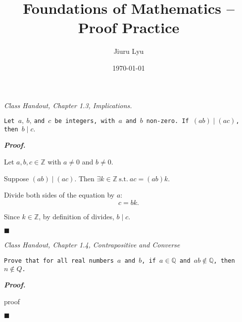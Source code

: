 \documentclass[11pt,letter]{article}
\title{Foundations of Mathematics -- \textbf{Proof Practice}}
\author{Jiuru Lyu}
\date{\today}
\newenvironment*{p}{\par\noindent\textbf{\textit{Proof. }}\par}{\par\hfill $\blacksquare$\par}
\newenvironment*{q}[1]{\centering\emph{#1}\par\noindent\texttt}{}
\def\Z{{\mathbb{Z}}}
\def\Q{{\mathbb{Q}}}
\def\st{\ \mathrm{s.t.}\ }
\begin{document}
\maketitle
{}

\begin{framed}
\begin{q}{Class Handout, Chapter 1.3, Implications.}{Let $a,\ b,\ $and $c$ be integers, with $a$ and $b$ non-zero. If $(ab)\mid(ac)$, then $b\mid c.$}\end{q}
\end{framed}
\begin{p}
	Let	$a,b,c\in\Z$ with $a\neq0$ and $b\neq0$.\par Suppose $(ab)\mid(ac)$. Then $\exists k\in\Z\st ac=(ab)k$.\par Divide both sides of the equation by $a$: \[c=bk.\] \par Since $k\in\Z$, by definition of divides, $b\mid c$.
\end{p}
\begin{framed}

\begin{q}
{Class Handout, Chapter 1.4, Contrapositive and Converse}
{Prove that for all real numbers $a$ and $b$, if $a\in\Q$ and $ab\notin\Q$, then $n\notin Q$.}	
\end{q}	
\end{framed}
\begin{p}
	proof
\end{p}





\label{LastPage}
\end{document}
